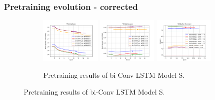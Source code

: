 \documentclass{beamer}
\begin{document}
\begin{frame}
    \frametitle{Pretraining evolution - corrected}
    \begin{figure}[htbp]
        \centering    
        \begin{subfigure}[b]{\textwidth}
            \centering
            \includegraphics[width=0.32\textwidth]{./entities/pretrained_new/unipose/train_losses.png}
            \includegraphics[width=0.32\textwidth]{./entities/pretrained_new/unipose/val_losses.png}
            \includegraphics[width=0.32\textwidth]{./entities/pretrained_new/unipose/val_accs.png}
            \caption{Pretraining results of bi-Conv LSTM Model S.}
        \end{subfigure}
        \hfill
    

\end{figure}
\end{frame}
\end{document}
